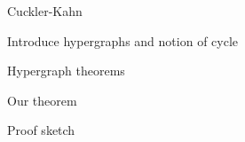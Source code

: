 \documentclass{beamer}
\theoremstyle{plain}
\begin{document}
	\begin{frame}{Cuckler-Kahn}
		
	\end{frame}


	\begin{frame}{Introduce hypergraphs and notion of cycle}
		
	\end{frame}


	\begin{frame}{Hypergraph theorems}
		
	\end{frame}


	\begin{frame}{Our theorem}
		
	\end{frame}


	\begin{frame}{Proof sketch}
		
	\end{frame}
\end{document}
